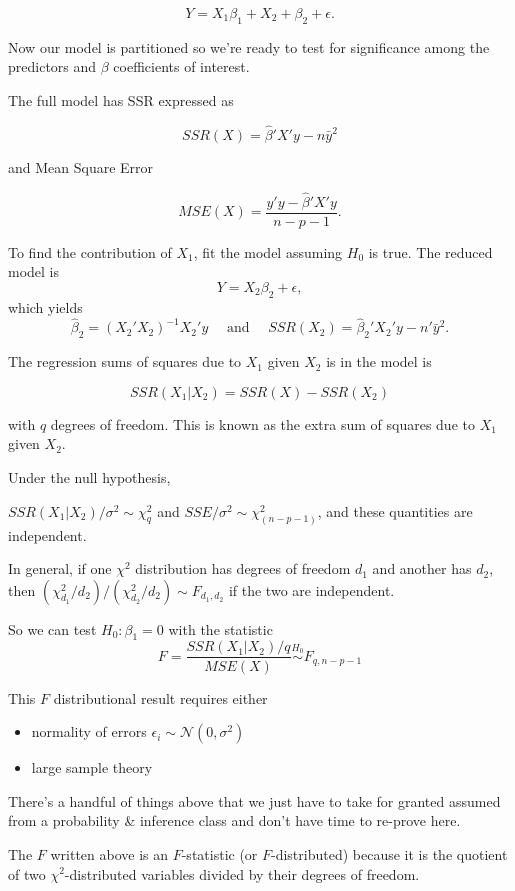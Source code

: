 \documentclass[
  letterpaper,
  DIV=11,
  numbers=noendperiod]{scrreport}
\providecommand{\tightlist}{%
  \setlength{\itemsep}{0pt}\setlength{\parskip}{0pt}}\usepackage{longtable,booktabs,array}
\begin{document}
\[Y = X_1 \beta_1 + X_2 + \beta_2 + \epsilon.\]

Now our model is partitioned so we're ready to test for significance
among the predictors and \(\beta\) coefficients of interest.

The full model has SSR expressed as

\[SSR(X) = \hat \beta' X' y - n \bar y^2\]

and Mean Square Error

\[MSE(X) = \frac{y'y - \hat \beta' X' y}{n-p-1}.\]

To find the contribution of \(X_1\), fit the model assuming \(H_0\) is
true. The {reduced model} is \[Y = X_2 \beta_2 + \epsilon,\] which
yields
\[\hat \beta_2 = (X_2'X_2)^{-1}X_2'y \quad \text{ and } \quad SSR(X_2) = \hat \beta_2' X_2' y - n' \bar y^2.\]

The regression sums of squares due to \(X_1\) given \(X_2\) is in the
model is

\[SSR(X_1|X_2) = SSR(X) - SSR(X_2)\]

with \(q\) degrees of freedom. This is known as the {extra sum of
squares due to \(X_1\) given \(X_2\)}.

Under the null hypothesis,

\(SSR(X_1|X_2)/\sigma^2 \sim \chi_q^2\) and
\(SSE/\sigma^2 \sim \chi_{(n-p-1)}^2\), and these quantities are
independent.

In general, if one \(\chi^2\) distribution has degrees of freedom
\(d_1\) and another has \(d_2\), then
\((\chi_{d_1}^2/d_2)/(\chi_{d_2}^2/d_2) \sim F_{d_1,d_2}\) if the two
are independent.

So we can test \(H_0: \beta_1 = 0\) with the statistic
\[F = \frac{SSR(X_1|X_2)/q}{MSE(X)} \stackrel{H_0}{\sim} F_{q,n-p-1}\]

This \(F\) distributional result requires either

\begin{itemize}
\tightlist
\item
  normality of errors \(\epsilon_i \sim \mathcal N(0,\sigma^2)\)
\item
  large sample theory
\end{itemize}

There's a handful of things above that we just have to take for granted
assumed from a probability \& inference class and don't have time to
re-prove here.

The \(F\) written above is an \(F\)-statistic (or \(F\)-distributed)
because it is the quotient of two \(\chi^2\)-distributed variables
divided by their degrees of freedom.
\end{document}

